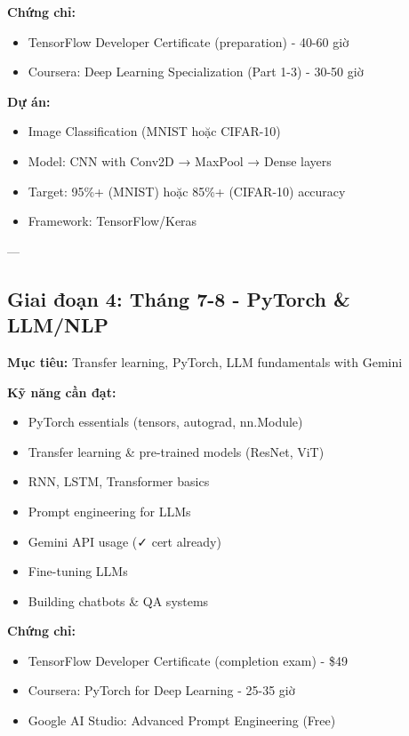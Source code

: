 \documentclass[12pt,a4paper]{article}
\begin{document}
\textbf{Chứng chỉ:}
\begin{itemize}
    \item TensorFlow Developer Certificate (preparation) - 40-60 giờ
    \item Coursera: Deep Learning Specialization (Part 1-3) - 30-50 giờ
\end{itemize}

\textbf{Dự án:}
\begin{itemize}
    \item Image Classification (MNIST hoặc CIFAR-10)
    \item Model: CNN with Conv2D → MaxPool → Dense layers
    \item Target: 95\%+ (MNIST) hoặc 85\%+ (CIFAR-10) accuracy
    \item Framework: TensorFlow/Keras
\end{itemize}

---

\subsection{Giai đoạn 4: Tháng 7-8 - PyTorch \& LLM/NLP}

\textbf{Mục tiêu:} Transfer learning, PyTorch, LLM fundamentals with Gemini

\textbf{Kỹ năng cần đạt:}
\begin{itemize}
    \item PyTorch essentials (tensors, autograd, nn.Module)
    \item Transfer learning \& pre-trained models (ResNet, ViT)
    \item RNN, LSTM, Transformer basics
    \item Prompt engineering for LLMs
    \item Gemini API usage (✓ cert already)
    \item Fine-tuning LLMs
    \item Building chatbots \& QA systems
\end{itemize}

\textbf{Chứng chỉ:}
\begin{itemize}
    \item TensorFlow Developer Certificate (completion exam) - \$49
    \item Coursera: PyTorch for Deep Learning - 25-35 giờ
    \item Google AI Studio: Advanced Prompt Engineering (Free)
\end{itemize}
\end{document}
